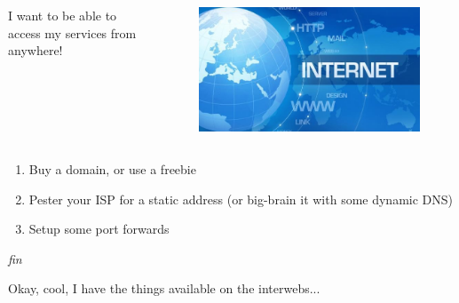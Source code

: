 \documentclass{beamer}
\begin{document}
\begin{frame}
    \begin{columns}
        \begin{column}{0.5\textwidth}
            I want to be able to access my services from anywhere!
        \end{column}
        \begin{column}{0.5\textwidth}
            \begin{figure}
                \centering
                \includegraphics[width=\textwidth]{../resources/internet.jpg}
            \end{figure}
        \end{column}
    \end{columns}
\end{frame}

\begin{frame}
    \begin{enumerate}
        \item Buy a domain, or use a freebie
        \item Pester your ISP for a static address (or big-brain it with some dynamic DNS)
        \item Setup some port forwards
    \end{enumerate}
\end{frame}


\begin{frame}
    \begin{center}
        \textit{fin}
    \end{center}
\end{frame}

\begin{frame}
    \begin{center}
        Okay, cool, I have the things available on the interwebs...
    \end{center}
\end{frame}
\end{document}
